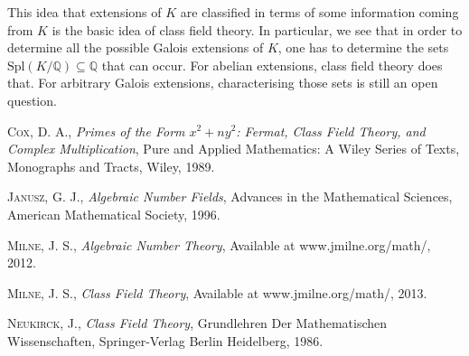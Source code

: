 \documentclass[]{amsart}
\newcommand{\Q}{\mathbb{Q}}
\newcommand{\Spl}{\text{Spl}}
\begin{document}
			This idea that extensions of $K$ are classified in terms of some information coming from $K$ is the basic idea of class field theory. In particular, we see that in order to determine all the possible Galois extensions of $K$, one has to determine the sets $\Spl(K/\Q)\subseteq\Q$ that can occur. For abelian extensions, class field theory does that. For arbitrary Galois extensions, characterising those sets is still an open question.
\begin{thebibliography}{DDDD}
    {\scshape Cox, D. A.}, \emph{Primes of the Form $x^2 + ny^2$: Fermat, Class Field Theory, and Complex Multiplication}, Pure and Applied Mathematics: A Wiley Series of Texts, Monographs and Tracts, Wiley, 1989.

    {\scshape Janusz, G. J.}, \emph{Algebraic Number Fields}, Advances in the Mathematical Sciences, American Mathematical Society, 1996.    

    {\scshape Milne, J. S.}, \emph{Algebraic Number Theory}, Available at www.jmilne.org/math/, 2012. 

    {\scshape Milne, J. S.}, \emph{Class Field Theory}, Available at www.jmilne.org/math/, 2013. 

    {\scshape Neukirck, J.}, \emph{Class Field Theory}, Grundlehren Der Mathematischen Wissenschaften, Springer-Verlag Berlin Heidelberg, 1986.
\end{thebibliography}
\end{document}
